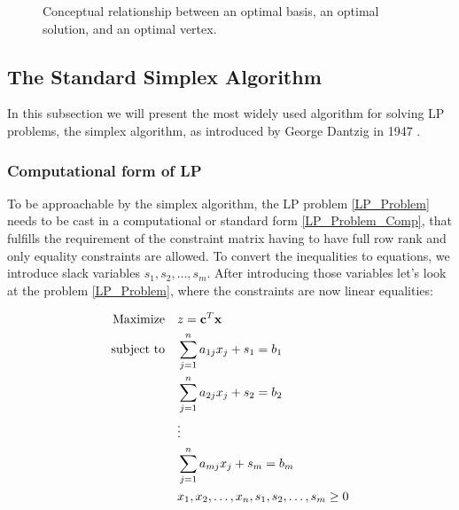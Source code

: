 \begin{figure}[!htb]
    \centering
    \caption{Conceptual relationship between an optimal basis, an optimal solution,
        and an optimal vertex.}
\end{figure} \label{equivalence_terms}

\subsection{The Standard Simplex Algorithm}

In this subsection we will present the most widely used algorithm for solving LP problems, the simplex algorithm, as introduced by George Dantzig in 1947 \parencite{dantzig1990origins}.

\subsubsection{Computational form of LP}

To be approachable by the simplex algorithm, the LP problem \ref{LP_Problem} needs to be cast in a computational or standard form \ref{LP_Problem_Comp}, that fulfills the requirement of the constraint matrix having to have full row rank and only equality constraints are allowed. To convert the inequalities to equations, we introduce slack variables \(s_1, s_2, \dots, s_m\). After introducing those variables let's look at the problem \ref{LP_Problem}, where the constraints are now linear equalities:

\begin{align}
    \text{Maximize} \quad   & z = \mathbf{c}^T \mathbf{x} \notag                            \\
    \text{subject to} \quad & \sum_{j=1}^{n} a_{1j} x_j + s_1 = b_1 \notag                  \\
                            & \sum_{j=1}^{n} a_{2j} x_j + s_2 = b_2 \notag                  \\
                            & \vdots \notag                                                 \\
                            & \sum_{j=1}^{n} a_{mj} x_j + s_m = b_m \label{LP_Problem_Comp} \\
                            & x_1, x_2, \dots, x_n, s_1, s_2, \dots, s_m \geq 0 \notag
\end{align}

